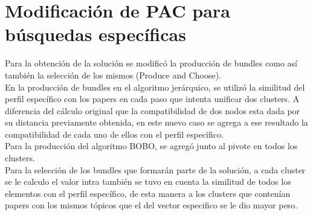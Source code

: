 \section{Modificación de PAC para búsquedas específicas}
Para la obtención de la solución se modificó la producción de bundles como así también la 
selección de los mismos (Produce and Choose). \\
En la producción de bundles en el algoritmo jerárquico, se utilizó la similitud del perfil 
específico con los papers en cada paso que intenta unificar dos clusters. A diferencia del cálculo 
original que la compatibilidad de dos nodos esta dada por su distancia previamente obtenida, en 
este nuevo caso se agrega a ese resultado la compatibilidad de cada uno de ellos con el perfil 
específico. \\
Para la producción del algoritmo BOBO, se agregó junto al pivote en todos los clusters. \\
Para la selección de los bundles que formarán parte de la solución, a cada cluster se le 
calculo el valor intra también se tuvo en cuenta la similitud de todos los elementos con el perfil  
específico, de esta manera a los clusters que contenían papers con los mismos tópicos que el del 
vector especifico se le dio mayor peso.

